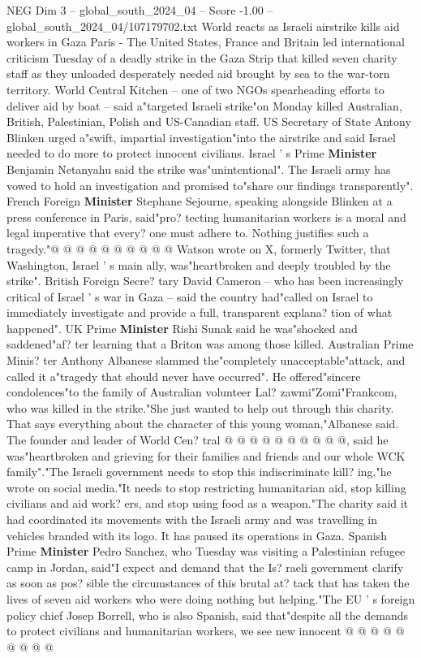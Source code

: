 \begin{textsample}{NEG Dim 3 – global\_south\_2024\_04 – Score -1.00 – global\_south\_2024\_04/107179702.txt}  \label{ex:f3_neg_248}
World reacts as Israeli airstrike kills aid workers in Gaza Paris - The United States, France and Britain led international criticism Tuesday of a deadly strike in the Gaza Strip that killed seven charity staff as they unloaded desperately needed aid brought by sea to the war-torn territory.
World Central Kitchen -- one of two NGOs spearheading efforts to deliver aid by boat -- said a"targeted Israeli strike"on Monday killed Australian, British, Palestinian, Polish and US-Canadian staff.
US Secretary of State Antony Blinken urged a"swift, impartial investigation"into the airstrike and said Israel needed to do more to protect innocent civilians.
Israel ' s Prime \textbf{Minister} Benjamin Netanyahu said the strike was"unintentional".
The Israeli army has vowed to hold an investigation and promised to"share our findings transparently".
French Foreign \textbf{Minister} Stephane Sejourne, speaking alongside Blinken at a press conference in Paris, said"pro? tecting humanitarian workers is a moral and legal imperative that every? one must adhere to.
Nothing justifies such a tragedy."@ @ @ @ @ @ @ @ @ @ Watson wrote on X, formerly Twitter, that Washington, Israel ' s main ally, was"heartbroken and deeply troubled by the strike".
British Foreign Secre? tary David Cameron -- who has been increasingly critical of Israel ' s war in Gaza -- said the country had"called on Israel to immediately investigate and provide a full, transparent explana? tion of what happened".
UK Prime \textbf{Minister} Rishi Sunak said he was"shocked and saddened"af? ter learning that a Briton was among those killed.
Australian Prime Minis? ter Anthony Albanese slammed the"completely unacceptable"attack, and called it a"tragedy that should never have occurred".
He offered"sincere condolences"to the family of Australian volunteer Lal? zawmi"Zomi"Frankcom, who was killed in the strike."She just wanted to help out through this charity.
That says everything about the character of this young woman,"Albanese said.
The founder and leader of World Cen? tral @ @ @ @ @ @ @ @ @ @, said he was"heartbroken and grieving for their families and friends and our whole WCK family"."The Israeli government needs to stop this indiscriminate kill? ing,"he wrote on social media."It needs to stop restricting humanitarian aid, stop killing civilians and aid work? ers, and stop using food as a weapon."The charity said it had coordinated its movements with the Israeli army and was travelling in vehicles branded with its logo.
It has paused its operations in Gaza.
Spanish Prime \textbf{Minister} Pedro Sanchez, who Tuesday was visiting a Palestinian refugee camp in Jordan, said"I expect and demand that the Is? raeli government clarify as soon as pos? sible the circumstances of this brutal at? tack that has taken the lives of seven aid workers who were doing nothing but helping."The EU ' s foreign policy chief Josep Borrell, who is also Spanish, said that"despite all the demands to protect civilians and humanitarian workers, we see new innocent @ @ @ @ @ @ @ @ @

\end{textsample}
